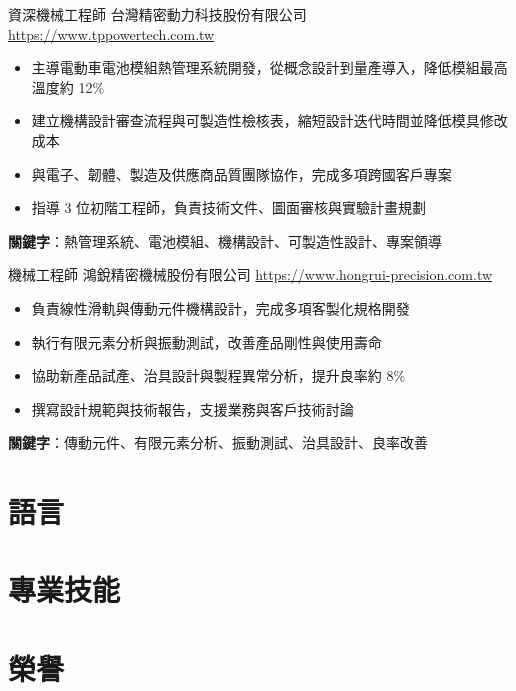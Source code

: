 \documentclass[a4paper, serif, 10pt]{moderncv}
\begin{document}
        {資深機械工程師}
        {台灣精密動力科技股份有限公司}
        {\url{https://www.tppowertech.com.tw}}
        {}
        {\begin{itemize}
\item 主導電動車電池模組熱管理系統開發，從概念設計到量產導入，降低模組最高溫度約 12\%
\item 建立機構設計審查流程與可製造性檢核表，縮短設計迭代時間並降低模具修改成本
\item 與電子、韌體、製造及供應商品質團隊協作，完成多項跨國客戶專案
\item 指導 3 位初階工程師，負責技術文件、圖面審核與實驗計畫規劃
\end{itemize}
\textbf{關鍵字}：熱管理系統、電池模組、機構設計、可製造性設計、專案領導}

        {機械工程師}
        {鴻銳精密機械股份有限公司}
        {\url{https://www.hongrui-precision.com.tw}}
        {}
        {\begin{itemize}
\item 負責線性滑軌與傳動元件機構設計，完成多項客製化規格開發
\item 執行有限元素分析與振動測試，改善產品剛性與使用壽命
\item 協助新產品試產、治具設計與製程異常分析，提升良率約 8\%
\item 撰寫設計規範與技術報告，支援業務與客戶技術討論
\end{itemize}
\textbf{關鍵字}：傳動元件、有限元素分析、振動測試、治具設計、良率改善}
\section{語言}

\section{專業技能}

\section{榮譽}
\end{document}
